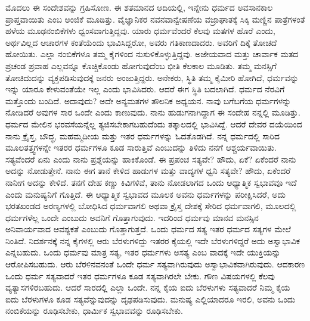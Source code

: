 ಮೊದಲು ಈ ಸಂದೇಶವನ್ನು ಗ್ರಹಿಸೋಣ. ಈ ಶತಮಾನದ ಆದಿಯಲ್ಲಿ, ಇನ್ನೇನು ಧರ್ಮದ ಅವಸಾನಕಾಲ ಪ್ರಾಪ್ತವಾಯಿತು ಎಂಬ ಅಂಜಿಕೆ ಮೂಡಿತ್ತು. ವೈಜ್ಞಾನಿಕರ ನವನವಾನ್ವೇಷಣೆಯ ವಜ್ರಾಘಾತಕ್ಕೆ ಸಿಕ್ಕಿ ಮಣ್ಣಿನ ಪಾತ್ರೆಗಳಂತೆ ಹಳೆಯ ಮೂಢನಂಬಿಕೆಗಳು ಧ್ವಂಸವಾಗುತ್ತಿದ್ದವು. ಯಾರು ಧರ್ಮವೆಂದರೆ ಕೆಲವು ಮತಗಳ ಹೊರೆ ಎಂದು, ಅರ್ಥವಿಲ್ಲದ ಆಚಾರಗಳ ಕಂತೆಯೆಂದು ಭಾವಿಸಿದ್ದರೋ, ಅವರು ಗತಿಕಾಣದಾದರು. ಅವರಿಗೆ ದಿಕ್ಕೆ ತೋಚದೆ ಹೋಯಿತು. ಎಲ್ಲಾ ನಂಬಿಕೆಗಳೂ ತಮ್ಮ ಕೈಗಳಿಂದ ನುಸುಳಿಕೊಳ್ಳುತ್ತಿದ್ದವು. ಅಜೇಯವಾದ ಮತ್ತು ಚಾರ್ವಾಕ ಮತದ ಪ್ರಚಂಡ ಪ್ರವಾಹ ಎಲ್ಲವನ್ನೂ ಕೊಚ್ಚಿಕೊಂಡು ಹೋಗುವುದೆಂಬ ಭೀತಿ ಕೆಲಕಾಲ ಮೂಡಿತು. ತಮ್ಮ ಮನಸ್ಸಿಗೆ ತೋಚಿದುದನ್ನು ವ್ಯಕ್ತಪಡಿಸುವುದಕ್ಕೆ ಜನರು ಅಂಜುತ್ತಿದ್ದರು. ಅನೇಕರು, ಸ್ಥಿತಿ ತಮ್ಮ ಕೈಮೀರಿ ಹೋಗಿದೆ, ಧರ್ಮವನ್ನು ಇನ್ನು ಯಾರೂ ಕೇಳುವಂತೆಯೇ ಇಲ್ಲ ಎಂದು ಭಾವಿಸಿದರು. ಆದರೆ ಈಗ ಸ್ಥಿತಿ ಬದಲಾಗಿದೆ. ಧರ್ಮದ ನೆರವಿಗೆ ಮತ್ತೊಂದು ಬಂದಿದೆ. ಅದಾವುದು? ಅದೇ ಅನ್ಯಮತಗಳ ತೌಲನಿಕ ಅಧ್ಯಯನ. ನಾವು ಬಗೆಬಗೆಯ ಧರ್ಮಗಳನ್ನು ನೋಡಿದರೆ ಅವುಗಳ ಸಾರ ಒಂದೇ ಎಂದು ಕಾಣುವುದು. ನಾನು ಹುಡುಗನಾಗಿದ್ದಾಗ ಈ ಸಂದೇಹ ನನ್ನಲ್ಲಿ ಮೂಡಿತ್ತು. ಧರ್ಮದ ಮೇಲಿನ ಭರವಸೆಯನ್ನೆಲ್ಲ ತ್ಯಜಿಸಬೇಕಾಗಬಹುದೆಂದು ತತ್ಕಾಲದಲ್ಲಿ ಭಾವಿಸಿದ್ದೆ. ಆದರೆ ದೇವರ ದಯೆಯಿಂದ ನಾನು ಕ್ರೈಸ್ತ, ಬೌದ್ಧ, ಮಹಮ್ಮದೀಯ ಮತ್ತು ಇತರ ಧರ್ಮಗಳನ್ನು ಓದತೊಡಗಿದೆ. ನನ್ನ ಧರ್ಮದಲ್ಲಿ ಸಾರಿದ ಮೂಲತತ್ತ್ವಗಳನ್ನೇ ಇತರರ ಧರ್ಮಗಳೂ ಕೂಡ ಸಾರುತ್ತಿವೆ ಎಂಬುದನ್ನು ತಿಳಿದು ನನಗೆ ಆಶ್ಚರ್ಯವಾಯಿತು. ಸತ್ಯವೆಂದರೆ ಏನು ಎಂದು ನಾನು ಪ್ರಶ್ನೆಯನ್ನು ಹಾಕಿಕೊಂಡೆ. ಈ ಪ್ರಪಂಚ ಸತ್ಯವೇ? ಹೌದು, ಏಕೆ? ಏಕೆಂದರೆ ನಾನು ಅದನ್ನು ನೋಡುತ್ತೇನೆ. ನಾನು ಈಗ ತಾನೆ ಕೇಳಿದ ಹಾಡುಗಳ ಮತ್ತು ವಾದ್ಯಗಳ ಧ್ವನಿ ಸತ್ಯವೇ? ಹೌದು, ಏಕೆಂದರೆ ನಾನೀಗ ಅದನ್ನು ಕೇಳಿದೆ. ತನಗೆ ದೇಹ ಕಣ್ಣು ಕಿವಿಗಳಿವೆ, ತಾನು ನೋಡಲಾಗದ ಒಂದು ಆಧ್ಯಾತ್ಮಿಕ ಸ್ವಭಾವವೂ ಇದೆ ಎಂದು ಮನುಷ್ಯನಿಗೆ ಗೊತ್ತಿದೆ. ಈ ಆಧ್ಯಾತ್ಮಿಕ ಸ್ವಭಾವದ ಮೂಲಕ ಅವನು ಧರ್ಮಗಳನ್ನು ಪರೀಕ್ಷಿಸಿದರೆ, ಅದು ಭರತಖಂಡದ ಅರಣ್ಯಗಳಲ್ಲಿ ಬೋಧಿಸಿದ ಧರ್ಮವಾಗಲಿ ಅಥವಾ ಕ್ರೈಸ್ತ ದೇಶಕ್ಕೆ ಸೇರಿದ ಧರ್ಮವಾಗಲಿ, ಮೂಲದಲ್ಲಿ ಧರ್ಮಗಳೆಲ್ಲ ಒಂದೇ ಎಂಬುದು ಅವನಿಗೆ ಗೊತ್ತಾಗುವುದು. ಇದರಿಂದ ಧರ್ಮವು ಮಾನವ ಮನಸ್ಸಿನ ಅನಿವಾರ್ಯವಾದ ಆವಶ್ಯಕತೆ ಎಂಬುದು ಗೊತ್ತಾಗುತ್ತದೆ. ಒಂದು ಧರ್ಮದ ಸತ್ಯ ಇತರ ಧರ್ಮದ ಸತ್ಯಗಳ ಮೇಲೆ ನಿಂತಿದೆ. ನಿದರ್ಶನಕ್ಕೆ ನನ್ನ ಕೈಗಳಲ್ಲಿ ಆರು ಬೆರಳುಗಳಿದ್ದು ಇತರರ ಕೈಯಲ್ಲಿ ಇದೇ ಬೆರಳುಗಳಿದ್ದರೆ ಅದು ಅಸ್ವಾಭಾವಿಕ ಎನ್ನಬಹುದು. ಒಂದು ಧರ್ಮವು ಮಾತ್ರ ಸತ್ಯ, ಇತರ ಧರ್ಮಗಳು ಅಸತ್ಯ ಎಂಬ ವಾದಕ್ಕೆ ಇದೇ ಯುಕ್ತಿಯನ್ನು ಆರೋಪಿಸಬಹುದು. ಆರು ಬೆರಳಿನವನಂತೆ ಒಂದೇ ಧರ್ಮ ಸತ್ಯವಾಗಿರುವುದು ಅಸ್ವಾಭಾವಿಕವಾಗಿರುವುದು. ಆದಕಾರಣ ಒಂದು ಧರ್ಮ ಸತ್ಯವಾದರೆ ಇತರ ಧರ್ಮಗಳೂ ಕೂಡ ಸತ್ಯವಾಗಿರಲೇ ಬೇಕು. ಗೌಣ ವಿಷಯಗಳಲ್ಲಿ ಕೆಲವು ವ್ಯತ್ಯಾಸಗಳಿರಬಹುದು. ಆದರೆ ಸಾರದಲ್ಲಿ ಎಲ್ಲಾ ಒಂದೇ. ನನ್ನ ಕೈಯ ಐದು ಬೆರಳುಗಳು ಸತ್ಯವಾದರೆ ನಿಮ್ಮ ಕೈಯ ಐದು ಬೆರಳುಗಳೂ ಕೂಡ ಸತ್ಯವೆನ್ನುವುದನ್ನು ದೃಢಪಡಿಸುವುದು. ಮನುಷ್ಯ ಎಲ್ಲಿಯಾದರೂ ಇರಲಿ, ಅವನು ಒಂದು ನಂಬಿಕೆಯನ್ನು ರೂಢಿಸಬೇಕು, ಧಾರ್ಮಿಕ ಸ್ವಭಾವವನ್ನು ರೂಢಿಸಬೇಕು.

